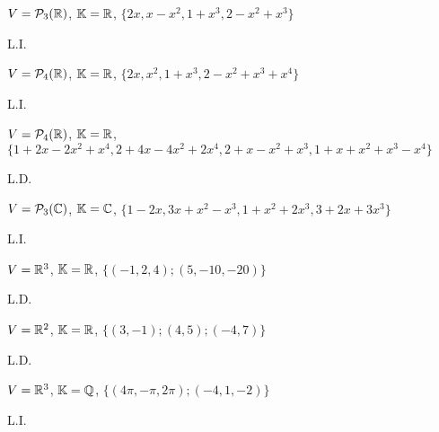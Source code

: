 \documentclass[12pt]{exam}
\begin{document}
    \begin{exercicio}
        $V = \mathcal{P}_3(\mathbb{R})$, $\mathbb{K} = \mathbb{R}$, $\{2x, x - x^2, 1 + x^3, 2 - x^2 + x^3\}$
        \begin{solucao}
            L.I.
        \end{solucao}
    \end{exercicio}

    \begin{exercicio}
        $V = \mathcal{P}_4(\mathbb{R})$, $\mathbb{K} = \mathbb{R}$, $\{2x, x^2, 1 + x^3, 2 - x^2 + x^3 + x^4\}$
        \begin{solucao}
            L.I.
        \end{solucao}
    \end{exercicio}

    \begin{exercicio}
        $V = \mathcal{P}_4(\mathbb{R})$, $\mathbb{K} = \mathbb{R}$, $\{1 + 2x - 2x^2 + x^4, 2 + 4x - 4x^2 + 2x^4, 2 + x - x^2 + x^3, 1 + x + x^2 + x^3 - x^4\}$
        \begin{solucao}
            L.D.
        \end{solucao}
    \end{exercicio}

    \begin{exercicio}
        $V = \mathcal{P}_3(\mathbb{C})$, $\mathbb{K} = \mathbb{C}$, $\{1 - 2x, 3x + x^2 - x^3, 1 + x^2 + 2x^3, 3 + 2x + 3x^3\}$
        \begin{solucao}
            L.I.
        \end{solucao}
    \end{exercicio}

    \begin{exercicio}
        $V = \mathbb{R}^3$, $\mathbb{K} = \mathbb{R}$, $\{(-1, 2, 4); (5, -10, -20)\}$
        \begin{solucao}
            L.D.
        \end{solucao}
    \end{exercicio}

    \begin{exercicio}
        $V = \mathbb{R}^2$, $\mathbb{K} = \mathbb{R}$, $\{(3, -1); (4, 5); (-4, 7)\}$
        \begin{solucao}
            L.D.
        \end{solucao}
    \end{exercicio}

    \begin{exercicio}
        $V = \mathbb{R}^3$, $\mathbb{K} = \mathbb{Q}$, $\{(4\pi, -\pi, 2\pi); (-4, 1, -2)\}$
        \begin{solucao}
            L.I.
        \end{solucao}
    \end{exercicio}
\end{document}
